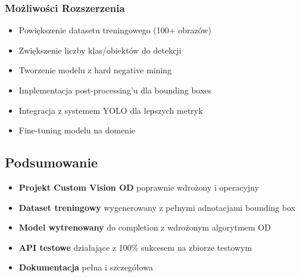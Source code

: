 \subsubsection{Możliwości Rozszerzenia}

\begin{itemize}
	\item Powiększenie datasetu treningowego (100+ obrazów)
	\item Zwiększenie liczby klas/obiektów do detekcji
	\item Tworzenie modelu z hard negative mining
	\item Implementacja post-processing'u dla bounding boxes
	\item Integracja z systemem YOLO dla lepszych metryk
	\item Fine-tuning modelu na domenie
\end{itemize}

\subsection{Podsumowanie}

\begin{itemize}
	\item  \textbf{Projekt Custom Vision OD} poprawnie wdrożony i operacyjny
	\item  \textbf{Dataset treningowy} wygenerowany z pełnymi adnotacjami bounding box
	\item  \textbf{Model wytrenowany} do completion z wdrożonym algorytmem OD
	\item  \textbf{API testowe} działające z 100\% sukcesem na zbiorze testowym
	\item  \textbf{Dokumentacja} pełna i szczegółowa
\end{itemize}
